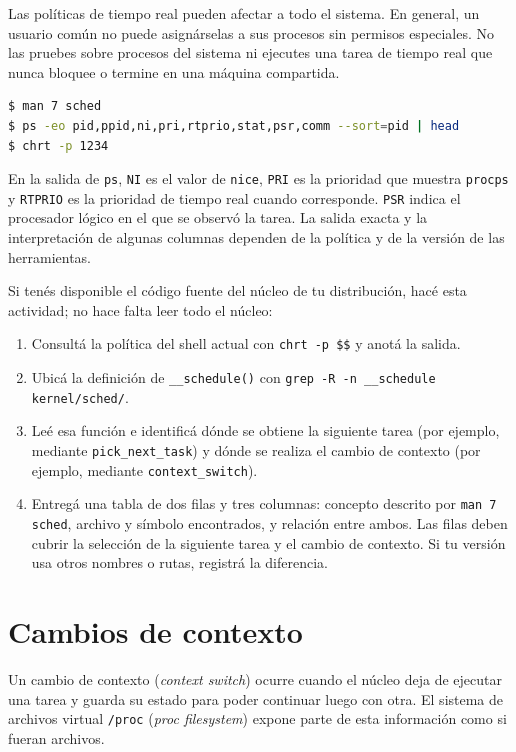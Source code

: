 \documentclass[11pt,a4paper]{article}
\begin{document}
Las políticas de tiempo real pueden afectar a todo el sistema. En general,
un usuario común no puede asignárselas a sus procesos sin permisos especiales.
No las pruebes sobre procesos del sistema ni ejecutes una tarea de tiempo real
que nunca bloquee o termine en una máquina compartida.

\begin{lstlisting}[language=bash]
$ man 7 sched
$ ps -eo pid,ppid,ni,pri,rtprio,stat,psr,comm --sort=pid | head
$ chrt -p 1234
\end{lstlisting}

En la salida de \texttt{ps}, \texttt{NI} es el valor de \texttt{nice},
\texttt{PRI} es la prioridad que muestra \texttt{procps} y \texttt{RTPRIO}
es la prioridad de tiempo real cuando corresponde. \texttt{PSR} indica el
procesador lógico en el que se observó la tarea. La salida exacta y la
interpretación de algunas columnas dependen de la política y de la versión de
las herramientas.

\begin{extrabox}
Si tenés disponible el código fuente del núcleo de tu distribución, hacé esta
actividad; no hace falta leer todo el núcleo:

\begin{enumerate}
  \item Consultá la política del shell actual con
  \texttt{chrt -p \$\$} y anotá la salida.
  \item Ubicá la definición de \texttt{\_\_schedule()} con
  \texttt{grep -R -n \_\_schedule kernel/sched/}.
  \item Leé esa función e identificá dónde se obtiene la siguiente tarea (por
  ejemplo, mediante \texttt{pick\_next\_task}) y dónde se realiza el cambio de
  contexto (por ejemplo, mediante \texttt{context\_switch}).
  \item Entregá una tabla de dos filas y tres columnas: concepto descrito por
  \texttt{man 7 sched}, archivo y símbolo encontrados, y relación entre ambos.
  Las filas deben cubrir la selección de la siguiente tarea y el cambio de
  contexto. Si tu versión usa otros nombres o rutas, registrá la diferencia.
\end{enumerate}
\end{extrabox}

\section{Cambios de contexto}

Un cambio de contexto (\emph{context switch}) ocurre cuando el núcleo deja de
ejecutar una tarea y guarda su estado para poder continuar luego con otra. El
sistema de archivos virtual \texttt{/proc} (\emph{proc filesystem}) expone
parte de esta información como si fueran archivos.
\end{document}
